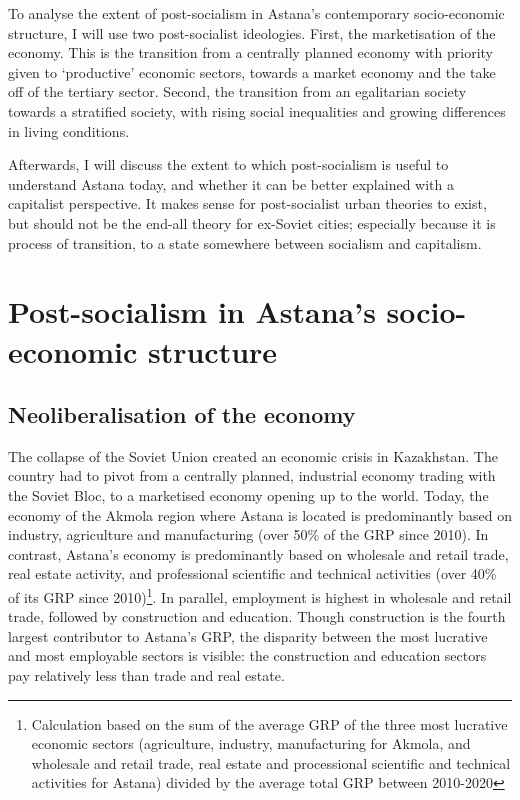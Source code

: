 \documentclass{article}
\begin{document}
To analyse the extent of post-socialism in Astana's contemporary socio-economic structure, I will use two post-socialist ideologies. 
First, the marketisation of the economy. This is the transition from a centrally planned economy with priority given to `productive' economic sectors, towards a market economy and the take off of the tertiary sector. 
Second, the transition from an egalitarian society towards a stratified society, with rising social inequalities and growing differences in living conditions.

Afterwards, I will discuss the extent to which post-socialism is useful to understand Astana today, and whether it can be better explained with a capitalist perspective. It makes sense for post-socialist urban theories to exist, but should not be the end-all theory for ex-Soviet cities; especially because it is process of transition, to a state somewhere between socialism and capitalism.

\section{Post-socialism in Astana's socio-economic structure}

\subsection{Neoliberalisation of the economy}

The collapse of the Soviet Union created an economic crisis in Kazakhstan. The country had to pivot from a centrally planned, industrial economy trading with the Soviet Bloc, to a marketised economy opening up to the world. Today, the economy of the Akmola region where Astana is located is predominantly based on industry, agriculture and manufacturing (over 50\% of the GRP since 2010). In contrast, Astana's economy is predominantly based on wholesale and retail trade, real estate activity, and professional scientific and technical activities (over 40\% of its GRP since 2010)\footnote{Calculation based on the sum of the average GRP of the three most lucrative economic sectors (agriculture, industry, manufacturing for Akmola, and wholesale and retail trade, real estate and processional scientific and technical activities for Astana) divided by the average total GRP between 2010-2020}. In parallel, employment is highest in wholesale and retail trade, followed by construction and education. Though construction is the fourth largest contributor to Astana's GRP, the disparity between the most lucrative and most employable sectors is visible: the construction and education sectors pay relatively less than trade and real estate.
\end{document}
